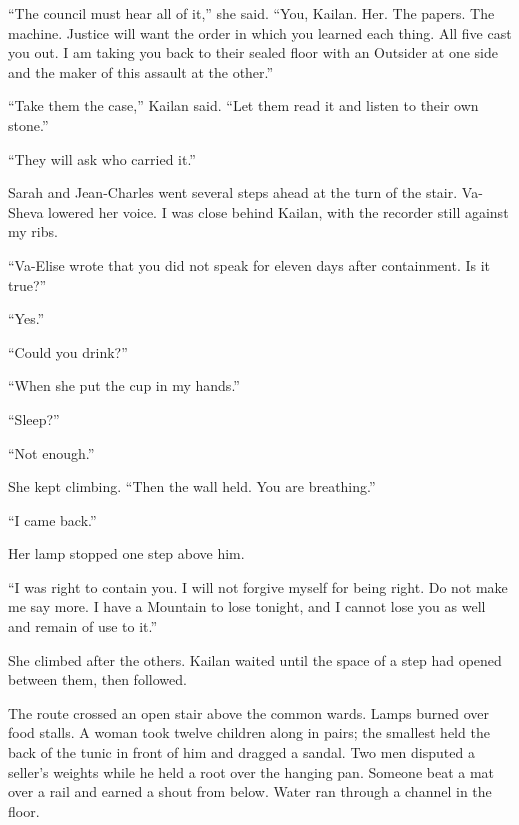 ``The council must hear all of it,'' she said. ``You, Kailan. Her. The papers. The machine. Justice will want the order in which you learned each thing. All five cast you out. I am taking you back to their sealed floor with an Outsider at one side and the maker of this assault at the other.''\par

``Take them the case,'' Kailan said. ``Let them read it and listen to their own stone.''\par

``They will ask who carried it.''\par

Sarah and Jean-Charles went several steps ahead at the turn of the stair. Va-Sheva lowered her voice. I was close behind Kailan, with the recorder still against my ribs.\par

``Va-Elise wrote that you did not speak for eleven days after containment. Is it true?''\par

``Yes.''\par

``Could you drink?''\par

``When she put the cup in my hands.''\par

``Sleep?''\par

``Not enough.''\par

She kept climbing. ``Then the wall held. You are breathing.''\par

``I came back.''\par

Her lamp stopped one step above him.\par

``I was right to contain you. I will not forgive myself for being right. Do not make me say more. I have a Mountain to lose tonight, and I cannot lose you as well and remain of use to it.''\par

She climbed after the others. Kailan waited until the space of a step had opened between them, then followed.\par

\ornament

The route crossed an open stair above the common wards. Lamps burned over food stalls. A woman took twelve children along in pairs; the smallest held the back of the tunic in front of him and dragged a sandal. Two men disputed a seller's weights while he held a root over the hanging pan. Someone beat a mat over a rail and earned a shout from below. Water ran through a channel in the floor.\par

